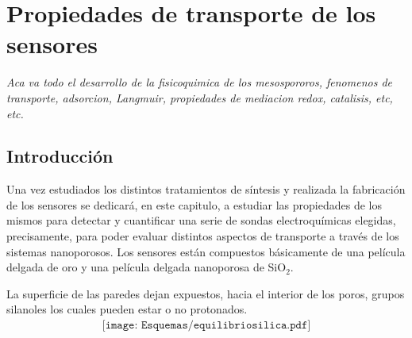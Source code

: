  \newcommand{\NoBiblioEQ}[1]{
 \ifthenelse{\equal{#1}{verdadero}}{}{}
 \NoBiblioEQ{verdadero}}


 \FormatoCapituloDosLineas
 
 \chapter{Propiedades de transporte de los sensores}
 \label{chap:Electroquimica}

 \thispagestyle{empty}
	
 \noindent\textit{Aca va todo el desarrollo de la fisicoquimica de los mesospororos, fenomenos de  transporte, adsorcion, Langmuir, propiedades de mediacion redox, catalisis, etc, etc.}

 \vfill
 \minitoc
 \newpage

\section{Introducción}

	Una vez estudiados los distintos tratamientos de síntesis y realizada la fabricación de los sensores se dedicará, en este capitulo, a estudiar las propiedades de los mismos para detectar y cuantificar una serie de sondas electroquímicas elegidas, precisamente, para poder evaluar distintos aspectos de transporte a través de los sistemas nanoporosos. 
	Los sensores están compuestos básicamente de una película delgada de oro y una película delgada nanoporosa de SiO$_2$. 

	La superficie de las paredes dejan expuestos, hacia el interior de los poros, grupos silanoles los cuales pueden estar o no protonados.\cite{Brinker1990,Soler-Illia2011} 
			\begin{equation}
				\begin{aligned}
				\texttt{[image: Esquemas/equilibriosilica.pdf]}
				\label{eq:equilibriosilica}
				\end{aligned}
				\end{equation}

